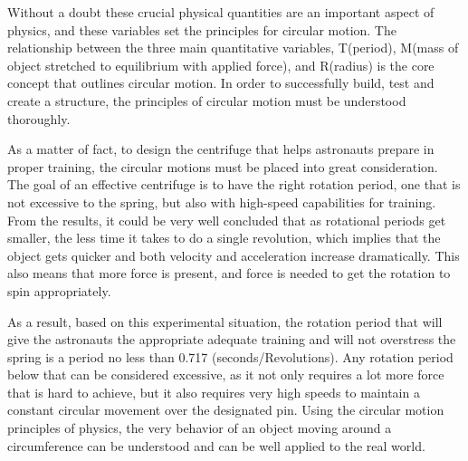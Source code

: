 

{Without a doubt these crucial physical quantities are an important aspect of physics, and these variables set the principles for circular motion. The relationship between the three main quantitative variables, T(period), M(mass of object stretched to equilibrium with applied force), and R(radius) is the core concept that outlines circular motion. In order to successfully build, test and create a structure, the principles of circular motion must be understood thoroughly.}

{As a matter of fact, to design the centrifuge that helps astronauts prepare in proper training, the circular motions must be placed into great consideration. The goal of an effective centrifuge is to have the right rotation period, one that is not excessive to the spring, but also with high-speed capabilities for training. From the results, it could be very well concluded that as rotational periods get smaller, the less time it takes to do a single revolution, which implies that the object gets quicker and both velocity and acceleration increase dramatically. This also means that more force is present, and force is needed to get the rotation to spin appropriately.}

{As a result, based on this experimental situation, the rotation period that will give the astronauts the appropriate adequate training and will not overstress the spring is a period no less than 0.717 (seconds/Revolutions). Any rotation period below that can be considered excessive, as it not only requires a lot more force that is hard to achieve, but it also requires very high speeds to maintain a constant circular movement over the designated pin. Using the circular motion principles of physics, the very behavior of an object moving around a circumference can be understood and
can be well applied to the real world.}

{}

{}

{}

{}

{}

{}

{}


